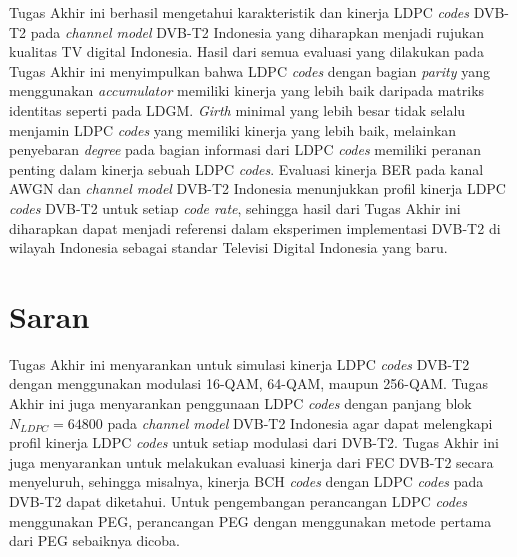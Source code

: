 Tugas Akhir ini berhasil mengetahui karakteristik dan kinerja LDPC \textit{codes} DVB-T2 pada \textit{channel model} DVB-T2 Indonesia yang diharapkan menjadi rujukan kualitas TV digital Indonesia. Hasil dari semua evaluasi yang dilakukan pada Tugas Akhir ini menyimpulkan bahwa LDPC \textit{codes} dengan bagian \textit{parity} yang menggunakan \textit{accumulator} memiliki kinerja yang lebih baik daripada matriks identitas seperti pada LDGM. \textit{Girth} minimal yang lebih besar tidak selalu menjamin LDPC \textit{codes} yang memiliki kinerja yang lebih baik, melainkan penyebaran \textit{degree} pada bagian informasi dari LDPC \textit{codes} memiliki peranan penting dalam kinerja sebuah LDPC \textit{codes}. 
Evaluasi kinerja BER pada kanal AWGN dan \textit{channel model} DVB-T2 Indonesia menunjukkan profil kinerja LDPC \textit{codes} DVB-T2 untuk setiap \textit{code rate}, sehingga hasil dari Tugas Akhir ini diharapkan dapat menjadi referensi dalam eksperimen implementasi DVB-T2 di wilayah Indonesia sebagai standar Televisi Digital Indonesia yang baru.


\section{Saran}

Tugas Akhir ini menyarankan untuk simulasi kinerja LDPC \textit{codes} DVB-T2 dengan menggunakan modulasi 16-QAM, 64-QAM, maupun 256-QAM. Tugas Akhir ini juga menyarankan penggunaan LDPC \textit{codes} dengan panjang blok $N_{LDPC}=64800$ pada \textit{channel model} DVB-T2 Indonesia agar dapat melengkapi profil kinerja LDPC \textit{codes} untuk setiap modulasi dari DVB-T2. Tugas Akhir ini juga menyarankan untuk melakukan evaluasi kinerja dari FEC DVB-T2 secara menyeluruh, sehingga misalnya, kinerja  BCH \textit{codes} dengan LDPC \textit{codes} pada DVB-T2 dapat diketahui. Untuk pengembangan perancangan LDPC \textit{codes} menggunakan PEG, perancangan PEG dengan menggunakan metode pertama dari PEG sebaiknya dicoba.
